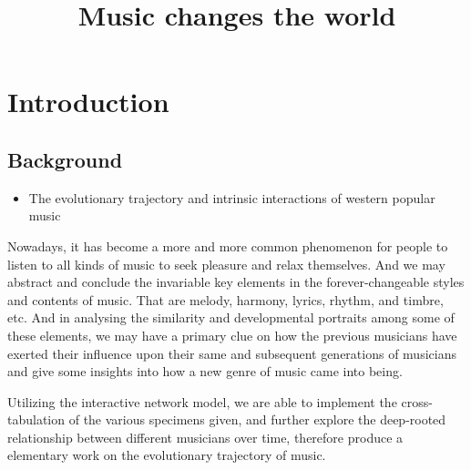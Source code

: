\documentclass[12pt]{article}
\begin{document}
\clearpage
\pagestyle{fancy}
\newpage
\setcounter{page}{1}
\title{Music changes the world}
\maketitle
\tableofcontents
\section{Introduction}
\subsection{Background}
\begin{itemize}
\item The evolutionary trajectory and intrinsic interactions of western popular music
\end {itemize}\quad \quad
Nowadays, it has become a more and more common phenomenon for people to listen to all kinds of music to seek pleasure and relax themselves. And we may abstract and conclude the invariable key elements in the forever-changeable styles and contents of music. That are melody, harmony, lyrics, rhythm, and timbre, etc. And in analysing the similarity and developmental portraits among some of these elements, we may have a primary clue on how the previous musicians have exerted their influence upon their same and subsequent generations of musicians and give some insights into how a new genre of music came into being.\par
Utilizing the interactive network model, we are able to implement the cross-tabulation of the various specimens given, and further explore the deep-rooted relationship between different musicians over time, therefore produce a elementary work on the evolutionary trajectory of music.
\end{document}
